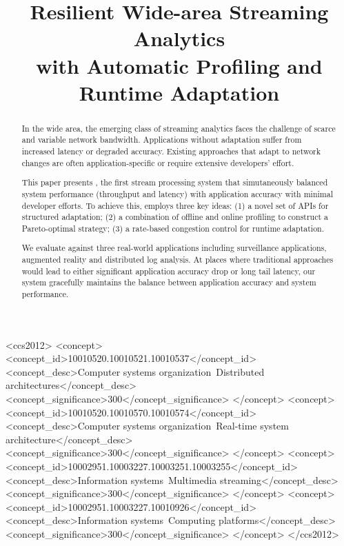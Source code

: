 \documentclass[10pt, sigplan, anonymous, review]{acmart}
\begin{document}
\title{Resilient Wide-area Streaming Analytics \\
  with Automatic Profiling and Runtime Adaptation}

\renewcommand{\shortauthors}{B. Zhang et al.}



\begin{abstract}
  In the wide area, the emerging class of streaming analytics faces the
  challenge of scarce and variable network bandwidth. Applications without
  adaptation suffer from increased latency or degraded accuracy. Existing
  approaches that adapt to network changes are often application-specific or
  require extensive developers' effort.

  This paper presents \sysname{}, the first stream processing system that
  simutaneously balanced system performance (throughput and latency) with
  application accuracy with minimal developer efforts. To achieve this,
  \sysname{} employs three key ideas: (1) a novel set of APIs for structured
  adaptation; (2) a combination of offline and online profiling to construct a
  Pareto-optimal strategy; (3) a rate-based congestion control for runtime
  adaptation.

  We evaluate \sysname{} against three real-world applications including
  surveillance applications, augmented reality and distributed log analysis. At
  places where traditional approaches would lead to either significant
  application accuracy drop or long tail latency, our system gracefully
  maintains the balance between application accuracy and system performance.
\end{abstract}

%
\begin{CCSXML}
<ccs2012>
  <concept>
    <concept_id>10010520.10010521.10010537</concept_id>
    <concept_desc>Computer systems organization~Distributed architectures</concept_desc>
    <concept_significance>300</concept_significance>
  </concept>
  <concept>
    <concept_id>10010520.10010570.10010574</concept_id>
    <concept_desc>Computer systems organization~Real-time system architecture</concept_desc>
    <concept_significance>300</concept_significance>
  </concept>
  <concept>
    <concept_id>10002951.10003227.10003251.10003255</concept_id>
    <concept_desc>Information systems~Multimedia streaming</concept_desc>
    <concept_significance>300</concept_significance>
  </concept>
  <concept>
    <concept_id>10002951.10003227.10010926</concept_id>
    <concept_desc>Information systems~Computing platforms</concept_desc>
    <concept_significance>300</concept_significance>
  </concept>
</ccs2012>
\end{CCSXML}
\end{document}
